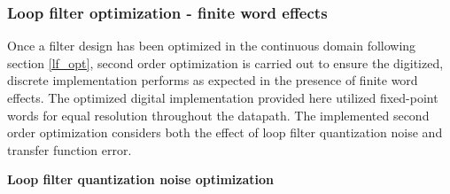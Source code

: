 \subsubsection{Loop filter optimization - finite word effects}
Once a filter design has been optimized in the continuous domain following section \ref{lf_opt}, second order optimization is carried out to ensure the digitized, discrete implementation performs as expected in the presence of finite word effects. The optimized digital implementation provided here utilized fixed-point words for equal resolution throughout the datapath. The implemented second order optimization considers both the effect of loop filter quantization noise and transfer function error.

\textbf{Loop filter quantization noise optimization}


